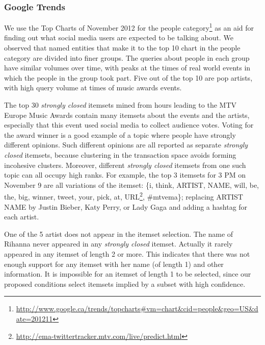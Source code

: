 \documentclass{sig-alternate}
\begin{document}
\subsubsection{Google Trends}
We use the Top Charts of November 2012 
for the people category\footnote{\url{http://www.google.ca/trends/topcharts\#vm=chart&cid=people&geo=US&date=201211}}
as an aid for finding out what social media users
are expected to be talking about.
We observed that named entities that make it to the top 10 chart in the people 
category  are divided into finer groups. 
The queries about 
people in each group 
have similar volumes over time, 
with peaks at the times of real world events
in which the people in the group took part.
Five out of the top 10 are pop artists, 
with high query volume at times of music awards events.

The top 30 \emph{strongly closed} itemsets mined from hours leading to 
the MTV Europe Music Awards contain
many itemsets about the events and the artists, 
especially that this event used social media to collect audience votes. 
Voting for the award winner is 
a good example of a topic where people have strongly different opinions.
Such different opinions are all reported as separate \emph{strongly closed} itemsets, 
because clustering in the transaction space avoids forming incohesive clusters. 
Moreover, different  \emph{strongly closed} itemsets from one such topic
can all occupy high ranks.
For example, the top 3 itemsets for 3 PM on November 9 are all variations of the %
itemset: \{i, think, ARTIST, NAME, will, be, the, big, winner, tweet, your, pick, at, URL\footnote{\url{http://ema-twittertracker.mtv.com/live/predict.html}}, \#mtvema\}; replacing ARTIST NAME by Justin Bieber, Katy Perry, or Lady Gaga and adding a hashtag for each artist.

One of the 5 artist does not appear in the itemset selection. 
The name of Rihanna never appeared in any \emph{strongly closed} itemset.
Actually it rarely appeared in any itemset of length 2 or more. 
This indicates that there was not enough support for any itemset
with her name (of length 1) and other information.
It is impossible for an itemset of length 1 to be selected,
since our proposed conditions select itemsets implied
by a subset with high confidence.
\end{document}
